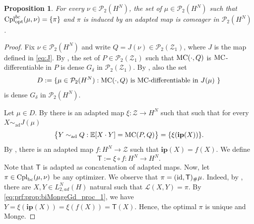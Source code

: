 \documentclass[a4paper]{amsart}
\numberwithin{theorem}{section}
\newtheorem{proposition}[theorem]{Proposition}
\theoremstyle{definition}
\newcommand{\E}{\mathbb{E}}
\newcommand{\id}{\textup{id}}
\newcommand{\law}{\mathcal{L}}
\newcommand{\cpl}{\textup{Cpl}}
\newcommand{\Pc}{\mathcal P}
\newcommand{\cplopt}{\cpl_{\rm opt}}
\newcommand{\cplbc}{\cpl_{\rm bc}}
\newcommand{\simad}{\sim_{\mathrm{ad}}}
\renewcommand{\H}{H}
\newcommand{\mc}{\textup{MC}}
\newcommand{\MC}{\textup{MC}}
\newcommand{\Zc}{\mathcal{Z}}
\newcommand{\ipp}{\mathbf{ip}}
\begin{document}
\begin{proposition}\label{prop:biMongeGd_proc}
 For every $\nu \in  \Pc_2(\H^N)$, the set of $\mu \in  \Pc_2(\H^N) $  such that $\cplopt^{bc}(\mu,\nu) = \{\pi\}$ and $\pi$ is induced by an adapted map is comeager in $\Pc_2(\H^N)$.  
\end{proposition}
\begin{proof}
Fix $\nu \in  \Pc_2(\H^N)$ and write $Q = J(\nu) \in \Pc_2(\Zc_1)$, where $J$ is the map defined in \eqref{eq:J}. By , the set of $P \in \Pc_2(\Zc_1) $ such that $\MC(\cdot, Q)$ is $\mc$-differentiable in $P$ is dense $G_\delta$ in $\Pc_2(\Zc_1) $. By , also the set 
\[
D := \{ \mu \in \Pc_2(\H^N) : \MC(\cdot, Q) \text{ is $\mc$-differentiable in $J(\mu)$ } \}
\]
is dense $G_\delta$ in $\Pc_2(\H^N)$. 

Let $\mu \in D$. By  there is an adapted map $\xi : \Zc \to \H^N$ such that such that for every $X \simad J(\mu)$ 
\begin{align}\label{eq:prf:prop:biMongeGd_proc_1}
            \big\{ Y \simad Q : \E[X \cdot Y] = \MC(P,Q) \big\} = \{ \xi(\ipp(X)) \}.
\end{align}
 By , there is an adapted map $f : \H^N \to \Zc$ such that $\ipp(X)=f(X)$. We define 
 \[
 \mathsf{T} := \xi \circ f : \H^N \to \H^N.
 \]
Note that  $\mathsf{T}$ is adapted as concatenation of adapted maps. Now, let $\pi \in \cplbc(\mu,\nu)$ be any optimizer. We observe that $\pi=(\id,\mathsf{T})_\#\mu$. Indeed, by , there are $X,Y \in L_{2,ad}^N(H)$ natural such that $\law(X,Y)=\pi$. By \eqref{eq:prf:prop:biMongeGd_proc_1}, we have $Y = \xi(\ipp(X))= \xi(f(X))= \mathsf{T}(X)$. Hence, the optimal $\pi$ is unique and Monge. 
\end{proof}
\end{document}
